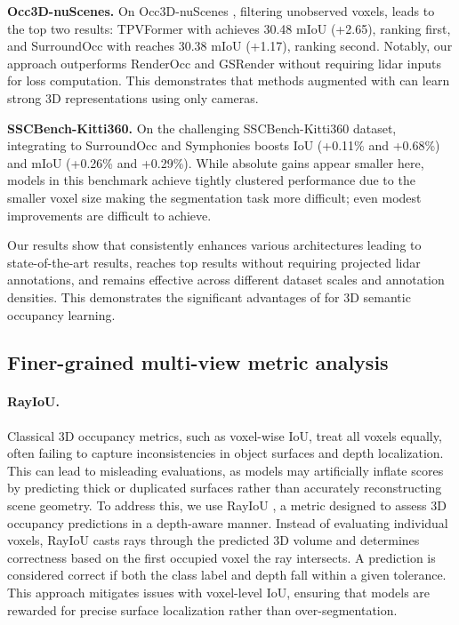 

\textbf{Occ3D-nuScenes.}
On Occ3D-nuScenes \cite{tian2023occ3d}, filtering unobserved voxels, \method{} leads to the top two results: TPVFormer with \method{} achieves 30.48 mIoU (+2.65), ranking first, and SurroundOcc with \method{} reaches 30.38 mIoU (+1.17), ranking second.
Notably, our approach outperforms RenderOcc \cite{pan2024renderocc} and GSRender \cite{sun2024gsrender} without requiring lidar inputs for loss computation. This demonstrates {that methods augmented with \method{}} can learn strong 3D representations using only cameras. 

\textbf{SSCBench-Kitti360.}
On the challenging SSCBench-Kitti360 \cite{Liao2022PAMI} dataset, integrating \method{} to SurroundOcc \cite{wei2023surroundocc} and Symphonies \cite{jiang2024symphonies} {boosts} IoU (+0.11\% and +0.68\%) and mIoU (+0.26\% and +0.29\%).
While absolute gains appear smaller here, models in this benchmark achieve tightly clustered performance due to the smaller voxel size making the segmentation task more difficult; even modest improvements are difficult to achieve.

Our results show that \method{} consistently enhances various architectures leading to state-of-the-art results, reaches top results without requiring projected lidar annotations, and remains effective across different dataset scales and annotation densities. This demonstrates the significant advantages of \method{} for 3D semantic occupancy learning.

\subsection{Finer-grained multi-view metric analysis}
\label{sec:exp:finer-details}




\paragraph{RayIoU.}
{Classical 3D occupancy metrics, such as voxel-wise IoU, treat all voxels equally, often failing to capture inconsistencies in object surfaces and depth localization. This can lead to misleading evaluations, as models may artificially inflate scores by predicting thick or duplicated surfaces \citep{liu2024sparseocc} rather than accurately reconstructing scene geometry.}
{To address this, we use RayIoU \cite{liu2024sparseocc}, a metric designed to assess 3D occupancy predictions in a depth-aware manner. Instead of evaluating individual voxels, RayIoU casts rays through the predicted 3D volume and determines correctness based on the first occupied voxel the ray intersects. A prediction is considered correct if both the class label and depth fall within a given tolerance. This approach mitigates issues with voxel-level IoU, ensuring that models are rewarded for precise surface localization rather than over-segmentation.}


